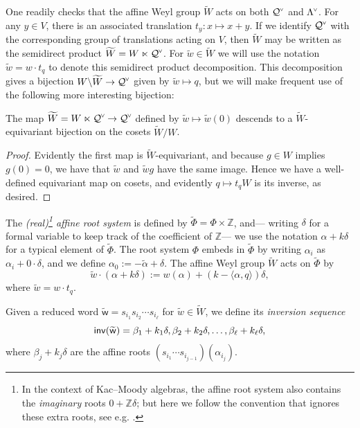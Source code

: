 \documentclass[ALCO,published]{cedram}
\newcommand{\darkblue}{\color{darkblue}} %
\newcommand{\defn}[1]{\emph{\darkblue #1}}
\newcommand{\chk}[1]{#1^{\normalfont\smash{\scalebox{.5}[.5]{\rotatebox{90}{\textbf{\textless}}}}}}
\newcommand{\wa}{\widetilde{W}}
\newcommand{\wphi}{\widetilde{\Phi}}
\newcommand{\Q}{\mathcal{Q}}
\newcommand{\cwl}{\chk{\Lambda}}
\newcommand{\waf}{\widetilde{w}}
\newcommand{\amax}{\tilde{\alpha}}
\newcommand{\inv}{{\sf inv}}
\begin{document}
One readily checks that the affine Weyl group $\wa$ acts on both $\chk{\Q}$ and $\cwl$. For any $y\in V$, there is an associated translation $t_y:x\mapsto x+y$. If we identify $\chk{\Q}$ with the corresponding group of translations acting on $V$, then $\wa$ may be written as the semidirect product $\wa=W\ltimes\chk{\Q}$.  For $\waf\in\wa$ we will use the notation $\waf=w\cdot t_q$ to denote this semidirect product decomposition.  This decomposition gives a bijection $W\backslash \wa\to\chk{\Q}$ given by $\waf\mapsto q$, but we will make frequent use of the following more interesting bijection:

\begin{theorem}
\label{thm:coset_to_coroot}
The map $\wa = W \ltimes \chk{\Q} \to \chk{\Q}$ defined by $\waf \mapsto \waf(0)$ descends to a $\wa$-equivariant bijection on the cosets $\wa/W$.
\end{theorem}
\begin{proof}
Evidently the first map is $\wa$-equivariant, and because $g\in W$ implies $g(0)=0$, we have that $\waf$ and $\waf g$ have the same image. Hence we have a well-defined equivariant map on cosets, and evidently $q\mapsto t_qW$ is its inverse, as desired.
\end{proof}

The \defn{(real)\footnote{In the context of Kac--Moody algebras, the affine root system also contains the \defn{imaginary} roots $0+\mathbb{Z}\delta$; but here we follow the convention that ignores these extra roots, see e.g. \cite{macdonald1971affine}.} affine root system} is defined by $\wphi = \Phi\times\mathbb{Z}$, and--- writing $\delta$ for a formal variable to keep track of the coefficient of $\mathbb{Z}$--- we use the notation $\alpha+k\delta$ for a typical element of $\wphi$.  The root system $\Phi$ embeds in $\wphi$ by writing $\alpha_i$ as $\alpha_i+0\cdot \delta$, and we  define $\alpha_0:=-\amax+\delta$.  The affine Weyl group $\wa$ acts on $\wphi$ by
\[ \waf \cdot (\alpha + k \delta) := w(\alpha) + (k-\langle \alpha,q\rangle)\delta, \]
where $\waf = w \cdot t_q$.

\begin{defi}
Given a reduced word $\mathsf{\waf}=s_{i_1} s_{i_2} \cdots s_{i_\ell}$ for  $\waf \in \wa$, we define its \defn{inversion sequence} 
\[\inv(\mathsf{\waf})=\beta_1+k_1\delta,\beta_2+k_2\delta,\ldots,\beta_\ell+k_\ell\delta,\] 
where $\beta_j+k_j\delta$ are the affine roots $(s_{i_1}\cdots s_{i_{j-1}})(\alpha_{i_j})$.
\end{defi}
\end{document}
